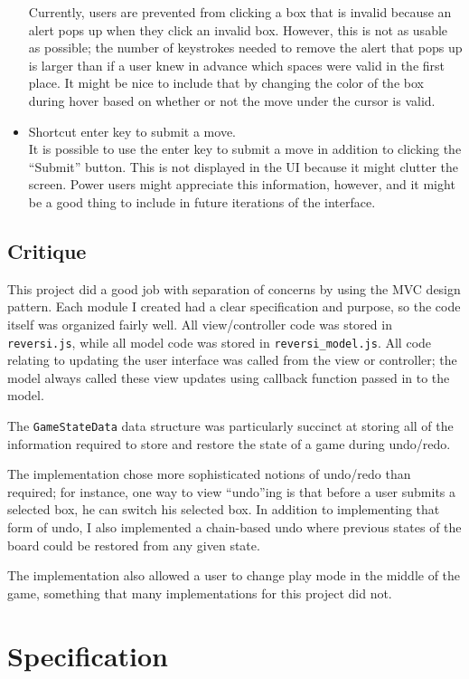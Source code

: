 \documentclass[11pt,letterpaper]{article}
\begin{document}
\begin{itemize}
Currently, users are prevented from clicking a box that is invalid because an alert pops up when they click an invalid box. However, this is not as usable as possible; the number of keystrokes needed to remove the alert that pops up is larger than if a user knew in advance which spaces were valid in the first place. It might be nice to include that by changing the color of the box during hover based on whether or not the move under the cursor is valid.
\item Shortcut enter key to submit a move.\\
It is possible to use the enter key to submit a move in addition to clicking the ``Submit'' button. This is not displayed in the UI because it might clutter the screen. Power users might appreciate this information, however, and it might be a good thing to include in future iterations of the interface.
\end{itemize}

\subsection{Critique}
This project did a good job with separation of concerns by using the MVC design pattern. Each module I created had a clear specification and purpose, so the code itself was organized fairly well. All view/controller code was stored in \texttt{reversi.js}, while all model code was stored in \texttt{reversi\_model.js}. All code relating to updating the user interface was called from the view or controller; the model always called these view updates using callback function passed in to the model.

The \texttt{GameStateData} data structure was particularly succinct at storing all of the information required to store and restore the state of a game during undo/redo.

The implementation chose more sophisticated notions of undo/redo than required; for instance, one way to view ``undo''ing is that before a user submits a selected box, he can switch his selected box. In addition to implementing that form of undo, I also implemented a chain-based undo where previous states of the board could be restored from any given state.

The implementation also allowed a user to change play mode in the middle of the game, something that many implementations for this project did not.
\section{Specification}
\end{document}
